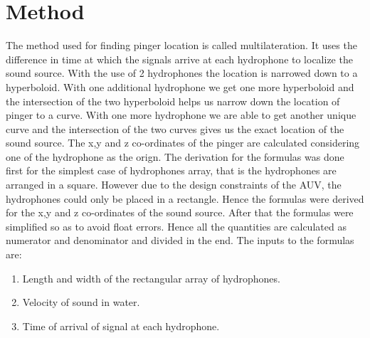 \section{Method}\label{sec:method}
The method used for finding pinger location is called multilateration. It uses the difference in time at which the signals arrive at each hydrophone to localize the sound source. With the use of 2 hydrophones the location is narrowed down to a hyperboloid. With one additional hydrophone we get one more hyperboloid and the intersection of the two hyperboloid helps us narrow down the location of pinger to a curve. With one more hydrophone we are able to get another unique curve and the intersection of the two curves gives us the exact location of the sound source. The x,y and z co-ordinates of the pinger are calculated considering one of the hydrophone as the orign.\newline
The derivation for the formulas was done first for the simplest case of hydrophones array, that is the hydrophones are arranged in a square. However due to the design constraints of the AUV, the hydrophones could only be placed in a rectangle. Hence the formulas were derived for the x,y and z co-ordinates of the sound source. After that the formulas were simplified so as to avoid float errors. Hence all the quantities are calculated as numerator and denominator and divided in the end.\newline
The inputs to the formulas are:\begin{enumerate}
\item Length and width of the rectangular array of hydrophones.
\item Velocity of sound in water.
\item Time of arrival of signal at each hydrophone.
\end{enumerate}


